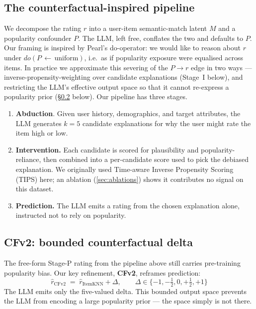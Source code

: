 \documentclass[11pt,a4paper]{article}
\begin{document}
\subsection{The counterfactual-inspired pipeline}
We decompose the rating $r$ into a user-item semantic-match latent $M$
and a popularity confounder $P$. The LLM, left free, conflates the two
and defaults to $P$. Our framing is inspired by Pearl's do-operator: we
would like to reason about $r$ under $do(P{\,\leftarrow\,}\text{uniform})$,
i.e.\ as if popularity exposure were equalised across items. In practice
we approximate this severing of the $P\rightarrow r$ edge in two ways —
inverse-propensity-weighting over candidate explanations (Stage~I
below), and restricting the LLM's effective output space so that it
cannot re-express a popularity prior (\S\ref{sec:cfv2} below). Our
pipeline has three stages.

\begin{enumerate}[leftmargin=1.8em,itemsep=1pt,topsep=2pt]
\item[\textbf{A.}]\textbf{Abduction}. Given user history, demographics,
  and target attributes, the LLM generates $k{=}5$ candidate explanations
  for why the user might rate the item high or low.
\item[\textbf{I.}]\textbf{Intervention.} Each candidate is scored for
  plausibility and popularity-reliance, then combined into a per-candidate
  score used to pick the debiased explanation. We originally used Time-aware
  Inverse Propensity Scoring (TIPS) here; an ablation (\cref{sec:ablations})
  shows it contributes no signal on this dataset.
\item[\textbf{P.}]\textbf{Prediction.} The LLM emits a rating from the
  chosen explanation alone, instructed not to rely on popularity.
\end{enumerate}

\subsection{CFv2: bounded counterfactual delta}
\label{sec:cfv2}
The free-form Stage-P rating from the pipeline above still carries
pre-training popularity bias. Our key refinement, \textbf{CFv2}, reframes
prediction:
\[
  \hat{r}_{\text{CFv2}} \;=\; \hat{r}_{\text{ItemKNN}} + \Delta,\qquad
  \Delta \in \{-1,-\tfrac12,0,+\tfrac12,+1\}
\]
The LLM emits only the five-valued delta. This bounded output space
prevents the LLM from encoding a large popularity prior — the space
simply is not there.
\end{document}
